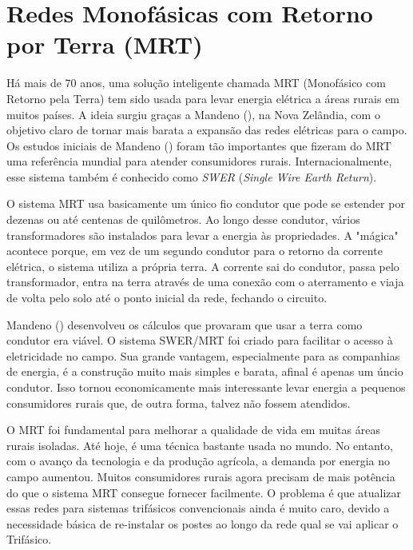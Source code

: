 \documentclass[oneside,openright,12pt]{ufsm_2021} %
\begin{document}
\section{Redes Monofásicas com Retorno por Terra (MRT)}

\par Há mais de 70 anos, uma solução inteligente chamada MRT (Monofásico com Retorno pela Terra) tem sido usada para levar energia elétrica a áreas rurais em muitos países. A ideia surgiu graças a Mandeno (\citeyear{mandeno_rural_1947}), na Nova Zelândia, com o objetivo claro de tornar mais barata a expansão das redes elétricas para o campo. Os estudos iniciais de Mandeno (\citeyear{mandeno_rural_1947}) foram tão importantes que fizeram do MRT uma referência mundial para atender consumidores rurais. Internacionalmente, esse sistema também é conhecido como \textit{SWER} (\textit{Single Wire Earth Return}).

\par O sistema MRT usa basicamente um único fio condutor que pode se estender por dezenas ou até centenas de quilômetros. Ao longo desse condutor, vários transformadores são instalados para levar a energia às propriedades. A "mágica" acontece porque, em vez de um segundo condutor para o retorno da corrente elétrica, o sistema utiliza a própria terra. A corrente sai do condutor, passa pelo transformador, entra na terra através de uma conexão com o aterramento e viaja de volta pelo solo até o ponto inicial da rede, fechando o circuito.

\par Mandeno (\citeyear{mandeno_rural_1947}) desenvolveu os cálculos que provaram que usar a terra como condutor era viável. O sistema SWER/MRT foi criado para facilitar o acesso à eletricidade no campo. Sua grande vantagem, especialmente para as companhias de energia, é a construção muito mais simples e barata, afinal é apenas um úncio condutor. Isso tornou economicamente mais interessante levar energia a pequenos consumidores rurais que, de outra forma, talvez não fossem atendidos.

\par O MRT foi fundamental para melhorar a qualidade de vida em muitas áreas rurais isoladas. Até hoje, é uma técnica bastante usada no mundo. No entanto, com o avanço da tecnologia e da produção agrícola, a demanda por energia no campo aumentou. Muitos consumidores rurais agora precisam de mais potência do que o sistema MRT consegue fornecer facilmente. O problema é que atualizar essas redes para sistemas trifásicos convencionais ainda é muito caro, devido a necessidade básica de re-instalar os postes ao longo da rede qual se vai aplicar o Trifásico.
\end{document}
